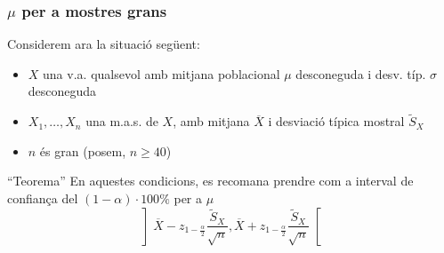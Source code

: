 \documentclass[12pt,t]{beamer}
\renewcommand{\emph}[1]{{\color{red}#1}}
\renewcommand{\geq}{\geqslant}
\theoremstyle{plain}
\theoremstyle{definition}
\begin{document}
\begin{frame}
\frametitle{$\mu$ per a mostres grans}

Considerem ara la situació següent:
\begin{itemize}
\item  $X$ una v.a.  \emph{qualsevol} amb mitjana poblacional $\mu$ desconeguda  \emph{i desv. típ. $\sigma$ desconeguda}

\item $X_1,\ldots,X_n$ una m.a.s. de $X$, amb mitjana $\overline{X}$ \emph{i desviació típica mostral $\widetilde{S}_X$}

\item \emph{$n$ és gran} (posem, $n\geq 40$)
\end{itemize}
\pause


\begin{block}{``Teorema''}
En aquestes condicions, es recomana prendre com a interval  de confiança del $(1-\alpha)\cdot 100\%$ per a $\mu$
$$
\left]\overline{X}-z_{1-\frac{\alpha}{2}}\frac{\widetilde{S}_X}{\sqrt{n}},
    \overline{X}+z_{1-\frac{\alpha}{2}}\frac{\widetilde{S}_X}{\sqrt{n}}\right[
$$
\end{block}



\end{frame}

%
%
%
%
%
\end{document}
